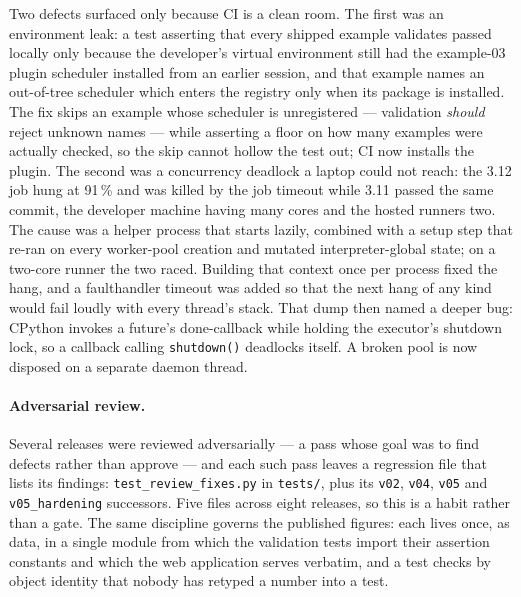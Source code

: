 Two defects surfaced only because CI is a clean room. The first was an
environment leak: a test asserting that every shipped example validates passed
locally only because the developer's virtual environment still had the
example-03 plugin scheduler installed from an earlier session, and that
example names an out-of-tree scheduler which enters the registry only when its
package is installed. The fix skips an example whose scheduler is unregistered
--- validation \emph{should} reject unknown names --- while asserting a floor
on how many examples were actually checked, so the skip cannot hollow the test
out; CI now installs the plugin. The second was a concurrency deadlock a
laptop could not reach: the 3.12 job hung at 91\,\% and was killed by the job
timeout while 3.11 passed the same commit, the developer machine having many
cores and the hosted runners two. The cause was a helper process that starts
lazily, combined with a setup step that re-ran on every worker-pool creation and
mutated interpreter-global state; on a two-core runner the two raced. Building
that context once per process fixed the hang, and a faulthandler timeout was
added so that the next hang of any kind would fail loudly with every thread's
stack. That dump then named a deeper bug: CPython invokes a future's
done-callback while holding the executor's shutdown lock, so a callback
calling \texttt{shutdown()} deadlocks itself. A broken pool is now disposed on
a separate daemon thread.

\paragraph{Adversarial review.} Several releases were reviewed adversarially ---
a pass whose goal was to find defects rather than approve --- and each such pass
leaves a regression file that lists its findings:
\texttt{test\_\allowbreak review\_\allowbreak fixes.py} in \texttt{tests/}, plus
its \texttt{v02}, \texttt{v04}, \texttt{v05} and \texttt{v05\_hardening}
successors. Five files across eight releases, so this is a habit rather than a
gate. The same
discipline governs the published figures: each lives once, as data, in a
single module from which the validation tests import their assertion constants
and which the web application serves verbatim, and a test checks by object
identity that nobody has retyped a number into a test.

